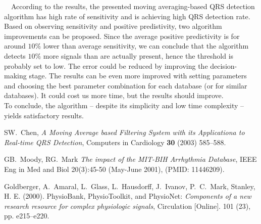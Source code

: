 \documentclass[a4paper,11pt]{article}
\begin{document}
\ \ According to the results, the presented moving averaging-based QRS detection algorithm has high rate of sensitivity and is achieving high QRS detection rate. 
Based on observing sensitivity and positive predistivity, two algorithm improvements can be proposed.
Since the average positive predictivity is for around $10 \%$ lower than average sensitivity, we can conclude that the algorithm detects $10 \%$ more signals than are actually present,
hence the threshold is probably set to low.
The error could be reduced by improving the decision-making stage.
The results can be even more improved with setting parameters and choosing the best parameter combination for each database (or for similar databases). It could cost us more time, but the results should improve.
\\
To conclude, the algorithm -- despite its simplicity and low time complexity -- yields satisfactory results.


\begin{thebibliography}{99}

    SW.~Chen, \emph{A Moving Average based Filtering System with its Applicationa to Real-time QRS Detection}, Computers in Cardiology \textbf{30} (2003) 585--588.

    GB.~Moody, RG.~Mark \emph{The impact of the MIT-BIH Arrhythmia Database}, IEEE Eng in Med and Biol 20(3):45-50 (May-June 2001), (PMID: 11446209).

    Goldberger, A.~Amaral, L.~Glass, L.~Hausdorff, J.~Ivanov, P.~C.~Mark, Stanley, H. E. (2000). PhysioBank, PhysioToolkit, and PhysioNet: \emph{Components of a new research resource for complex physiologic signals}, Circulation [Online]. 101 (23), pp. e215–e220.

\end{thebibliography}
\end{document}
